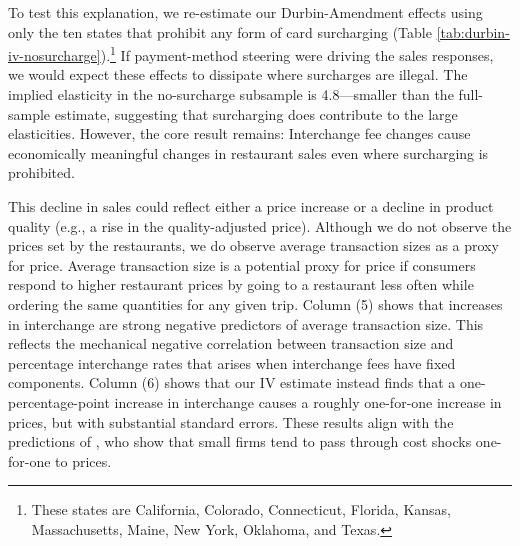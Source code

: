 \documentclass[11pt,english]{article}
\theoremstyle{remark}
\begin{document}
To test this explanation, we re-estimate our Durbin-Amendment effects using only the ten states that prohibit any form of card surcharging (Table \ref{tab:durbin-iv-nosurcharge}).\footnote{These states are California, Colorado, Connecticut, Florida, Kansas, Massachusetts, Maine, New York, Oklahoma, and Texas.}
If payment-method steering were driving the sales responses, we would expect these effects to dissipate where surcharges are illegal.
The implied elasticity in the no-surcharge subsample is 4.8---smaller than the full-sample estimate, suggesting that surcharging does contribute to the large elasticities.
However, the core result remains: Interchange fee changes cause economically meaningful changes in restaurant sales even where surcharging is prohibited.

This decline in sales could reflect either a price increase or a decline in product quality (e.g., a rise in the quality-adjusted price).
Although we do not observe the prices set by the restaurants, we do observe average transaction sizes as a proxy for price.
Average transaction size is a potential proxy for price if consumers respond to higher restaurant prices by going to a restaurant less often while ordering the same quantities for any given trip.
Column (5) shows that increases in interchange are strong negative predictors of average transaction size.
This reflects the mechanical negative correlation between transaction size and percentage interchange rates that arises when interchange fees have fixed components.
Column (6) shows that our IV estimate instead finds that a one-percentage-point increase in interchange causes a roughly one-for-one increase in prices, but with substantial standard errors.
These results align with the predictions of \citet{Amiti.etal2019}, who show that small firms tend to pass through cost shocks one-for-one to prices.
\end{document}
